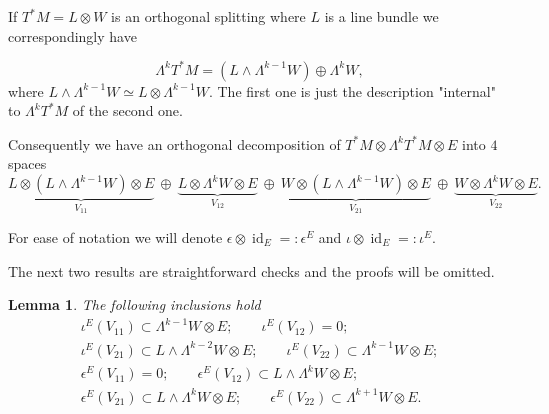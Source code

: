 \documentclass[12pt]{amsart} %
\newtheorem{lemma}[theorem]{Lemma}
\theoremstyle{definition}
\numberwithin{equation}{section}
\DeclareMathOperator{\id}{id}
\begin{document}
If $T^ *M=L\otimes W$ is an orthogonal splitting where $L$ is a line bundle we correspondingly have

\[\Lambda^{k}T^*M=(L\wedge \Lambda^{k-1}W)\oplus \Lambda^{k}W ,
\]
where  $L\wedge \Lambda^{k-1}W\simeq L\otimes \Lambda^{k-1}W$. The first one is just the description "internal" to $\Lambda^{k}T^*M$ of the second one.

Consequently we have an orthogonal  decomposition of $T^*M\otimes \Lambda^{k}T^*M\otimes E$ into $4$ spaces
\begin{equation}\label{equ8} \underbrace{L\otimes (L\wedge \Lambda^{k-1} W)\otimes E}_{V_{11}} ~\oplus~ \underbrace{L\otimes \Lambda^{k}W\otimes E}_{V_{12}}~\oplus~ \underbrace{W\otimes (L\wedge \Lambda^{k-1}W)\otimes E}_{V_{21}}~\oplus~ \underbrace{W\otimes \Lambda^{k}W\otimes E}_{V_{22}}.
\end{equation}

 For ease of notation we will denote $\epsilon \otimes\id_E=:\epsilon^ E$ and $\iota\otimes \id_E=:\iota^ E$. 

  The next two results are straightforward checks and the proofs will be omitted. 

\begin{lemma}\label{declem} The following inclusions hold
\begin{eqnarray} \iota^E(V_{11})\subset \Lambda^{k-1}W\otimes E;\qquad \iota^E(V_{12})=0;\qquad \qquad\\ \iota^E(V_{21})\subset L\wedge \Lambda^{k-2}W\otimes E;\qquad \iota^E(V_{22})\subset \Lambda^{k-1}W\otimes E;  \\
\epsilon^E(V_{11})=0;\qquad \epsilon^E(V_{12})\subset L\wedge \Lambda^kW\otimes E;\qquad \qquad\\
 \epsilon^E(V_{21})\subset L\wedge\Lambda^kW\otimes E;\qquad \epsilon^E(V_{22})\subset \Lambda^{k+1}W\otimes E.
\end{eqnarray}

\end{lemma}
\end{document}
